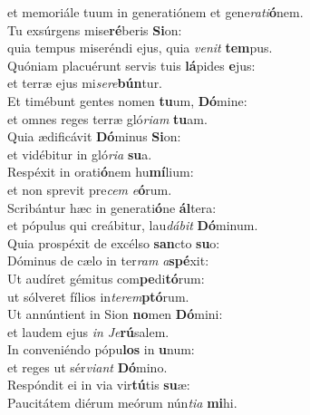 \oddverse et memoriále tuum in generatiónem et gene\textit{ra}\textit{ti}\textbf{ó}nem.\\
\evenverse Tu exsúrgens mise\textbf{ré}beris \textbf{Si}on:~\*\\
\evenverse quia tempus miseréndi ejus, quia \textit{ve}\textit{nit} \textbf{tem}pus.\\
\oddverse Quóniam placuérunt servis tuis \textbf{lá}pides \textbf{e}jus:~\*\\
\oddverse et terræ ejus mi\textit{se}\textit{re}\textbf{bún}tur.\\
\evenverse Et timébunt gentes nomen \textbf{tu}um, \textbf{Dó}mine:~\*\\
\evenverse et omnes reges terræ gló\textit{ri}\textit{am} \textbf{tu}am.\\
\oddverse Quia ædificávit \textbf{Dó}minus \textbf{Si}on:~\*\\
\oddverse et vidébitur in gló\textit{ri}\textit{a} \textbf{su}a.\\
\evenverse Respéxit in orati\textbf{ó}nem hu\textbf{mí}lium:~\*\\
\evenverse et non sprevit pre\textit{cem} \textit{e}\textbf{ó}rum.\\
\oddverse Scribántur hæc in generati\textbf{ó}ne \textbf{ál}tera:~\*\\
\oddverse et pópulus qui creábitur, lau\textit{dá}\textit{bit} \textbf{Dó}minum.\\
\evenverse Quia prospéxit de excélso \textbf{san}cto \textbf{su}o:~\*\\
\evenverse Dóminus de cælo in ter\textit{ram} \textit{a}\textbf{spé}xit:\\
\oddverse Ut audíret gémitus com\textbf{pe}di\textbf{tó}rum:~\*\\
\oddverse ut sólveret fílios in\textit{te}\textit{rem}\textbf{ptó}rum.\\
\evenverse Ut annúntient in Sion \textbf{no}men \textbf{Dó}mini:~\*\\
\evenverse et laudem ejus \textit{in} \textit{Je}\textbf{rú}salem.\\
\oddverse In conveniéndo pópu\textbf{los} in \textbf{u}num:~\*\\
\oddverse et reges ut sér\textit{vi}\textit{ant} \textbf{Dó}mino.\\
\evenverse Respóndit ei in via vir\textbf{tú}tis \textbf{su}æ:~\*\\
\evenverse Paucitátem diérum meórum nún\textit{ti}\textit{a} \textbf{mi}hi.\\
